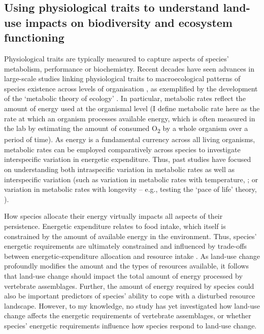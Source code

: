 \subsection{Using physiological traits to understand  land-use impacts on biodiversity and ecosystem functioning}

Physiological traits are typically measured to capture aspects of species' metabolism, performance or biochemistry. Recent decades have seen advances in large-scale studies linking physiological traits to macroecological patterns of species existence across levels of organisation \citep{Chown2004, RobertBurger2021}, as exemplified by the development of the `metabolic theory of ecology' \citep{Gillooly2001a, Brown2004a}. In particular, metabolic rates reflect the amount of energy used at the organismal level (I define metabolic rate here as the rate at which an organism processes available energy, which is often measured in the lab by estimating the amount of consumed O\textsubscript{2} by a whole organism over a period of time). As energy is a fundamental currency across all living organisms, metabolic rates can be employed comparatively across species to investigate interspecific variation in energetic expenditure. Thus, past studies have focused on understanding both intraspecific variation in metabolic rates \citep{Burton2011, Auer2017} as well as interspecific variation (such as variation in metabolic rates with temperature, \citet{Clarke2004a}; or variation in metabolic rates with longevity -- e.g., testing the `pace of life' theory, \citet{Stark2020}).

How species allocate their energy virtually impacts all aspects of their persistence. Energetic expenditure relates to food intake, which itself is constrained by the amount of available energy in the environment. Thus, species' energetic requirements are ultimately constrained and influenced by trade-offs between energetic-expenditure allocation and resource intake \citep{Auer2020}. As land-use change profoundly modifies the amount and the types of resources available, it follows that land-use change should impact the total amount of energy processed by vertebrate assemblages. Further, the amount of energy required by species could also be important predictors of species’ ability to cope with a disturbed resource landscape. However, to my knowledge, no study has yet investigated how land-use change affects the energetic requirements of vertebrate assemblages, or whether species' energetic requirements influence how species respond to land-use change.


